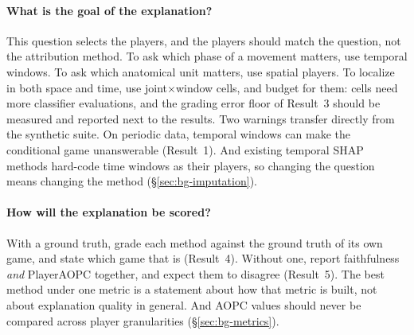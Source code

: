 \paragraph{What is the goal of the explanation?}
This question selects the players, and the players should match the
question, not the attribution method. To ask which phase of a movement
matters, use temporal windows. To ask which anatomical unit matters, use
spatial players. To localize in both space and time, use
joint$\times$window cells, and budget for them: cells need more classifier
evaluations, and the grading error floor of Result~3 should be measured and
reported next to the results. Two warnings transfer directly from the
synthetic suite. On periodic data, temporal windows can make the
conditional game unanswerable (Result~1). And existing temporal SHAP
methods hard-code time windows as their players, so changing the question
means changing the method (\S\ref{sec:bg-imputation}).

\paragraph{How will the explanation be scored?}
With a ground truth, grade each method against the ground truth of its own
game, and state which game that is (Result~4). Without one, report
faithfulness \emph{and} PlayerAOPC together, and expect them to disagree
(Result~5). The best method under one metric is a statement about how that
metric is built, not about explanation quality in general. And AOPC values
should never be compared across player granularities
(\S\ref{sec:bg-metrics}).

